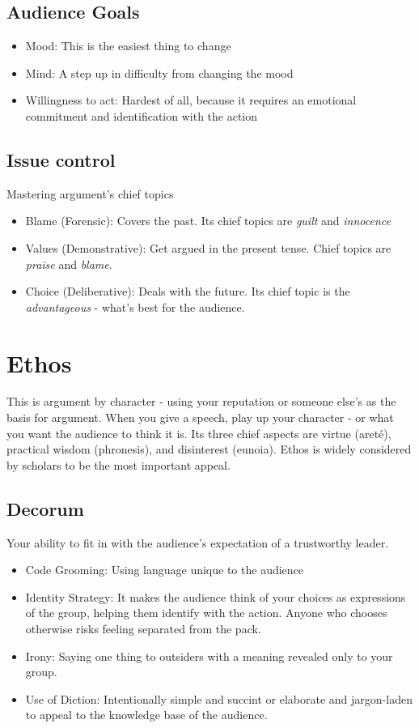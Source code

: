 \subsection{Audience Goals}
\begin{itemize}
	\item Mood: This is the easiest thing to change
	\item Mind: A step up in difficulty from changing the mood
	\item Willingness to act: Hardest of all, because it requires an emotional commitment and identification with the action 
\end{itemize}

\subsection{Issue control} 
Mastering argument's chief topics
\begin{itemize}
	\item Blame (Forensic): Covers the past. Its chief topics are \emph{guilt} and \emph{innocence}
	\item Values (Demonstrative): Get argued in the present tense. Chief topics are \emph{praise} and \emph{blame}.
	\item Choice (Deliberative): Deals with the future. Its chief topic is the \emph{advantageous} - what's best for the audience.
\end{itemize}

\section{Ethos}
This is argument by character - using your reputation or someone else's as the basis for argument. When you give a speech, play up your character - or what you want the audience to think it is. Its three chief aspects are virtue (areté), practical wisdom (phronesis), and disinterest (eunoia). Ethos is widely considered by scholars to be the most important appeal.\\

\subsection{Decorum}
Your ability to fit in with the audience's expectation of a trustworthy leader.
\begin{itemize}
	\item Code Grooming: Using language unique to the audience
	\item Identity Strategy: It makes the audience think of your choices as expressions of the group, helping them identify with the action. Anyone who chooses otherwise risks feeling separated from the pack. 
	\item Irony: Saying one thing to outsiders with a meaning revealed only to your group.
	\item Use of Diction: Intentionally simple and succint or elaborate and jargon-laden to appeal to the knowledge base of the audience.
\end{itemize}

